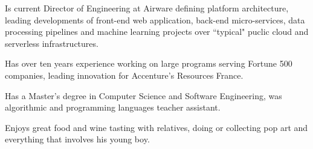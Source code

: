 
\begin{cvparagraph}

Is current Director of Engineering at Airware defining platform architecture, leading developments of front-end web application, back-end micro-services, data processing pipelines and machine learning projects over ``typical" puclic cloud and serverless infrastructures.

Has over ten years experience working on large programs serving Fortune 500 companies, leading innovation for Accenture’s Resources France.

Has a Master’s degree in Computer Science and Software Engineering, was algorithmic and programming languages teacher assistant.

Enjoys great food and wine tasting with relatives, doing or collecting pop art and everything that involves his young boy.
\end{cvparagraph}


